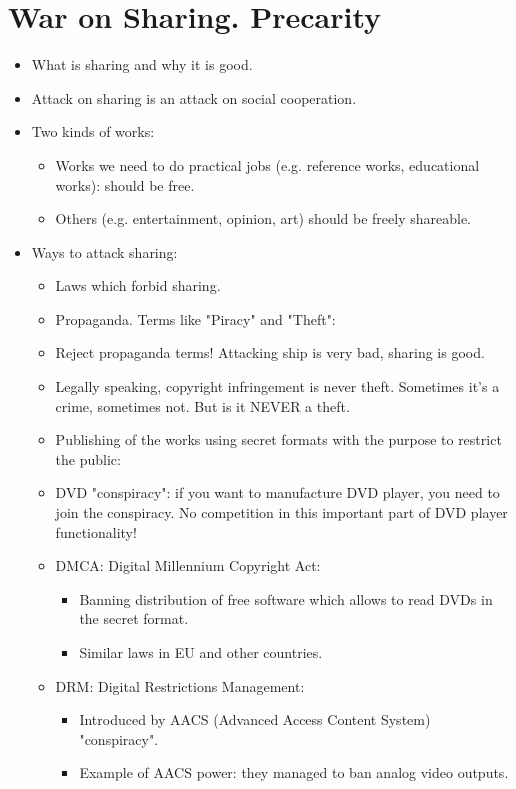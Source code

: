 \documentclass[twoside,openright]{report}
\begin{document}
\section{War on Sharing. Precarity}
\begin{itemize}
 \item    What is sharing and why it is good.
 \item    Attack on sharing is an attack on social cooperation.
 \item    Two kinds of works:
\begin{itemize}
 \item        Works we need to do practical jobs (e.g. reference works, educational works): should be free.
 \item        Others (e.g. entertainment, opinion, art) should be freely shareable.
\end{itemize}
 \item    Ways to attack sharing:
\begin{itemize}
 \item        Laws which forbid sharing.
 \item        Propaganda. Terms like "Piracy" and "Theft":
 \item            Reject propaganda terms! Attacking ship is very bad, sharing is good.
 \item            Legally speaking, copyright infringement is never theft. Sometimes it's a crime, sometimes not. But is it NEVER a theft.
 \item        Publishing of the works using secret formats with the purpose to restrict the public:
 \item            DVD "conspiracy": if you want to manufacture DVD player, you need to join the conspiracy. No competition in this important part of DVD player functionality! 
 \item        DMCA: Digital Millennium Copyright Act:
\begin{itemize}
 \item            Banning distribution of free software which allows to read DVDs in the secret format.
 \item            Similar laws in EU and other countries.
\end{itemize}
 \item        DRM: Digital Restrictions Management:
\begin{itemize}
 \item            Introduced by AACS (Advanced Access Content System) "conspiracy".
 \item            Example of AACS power: they managed to ban analog video outputs.

\end{itemize}
\end{itemize}
\end{itemize}
\end{document}
